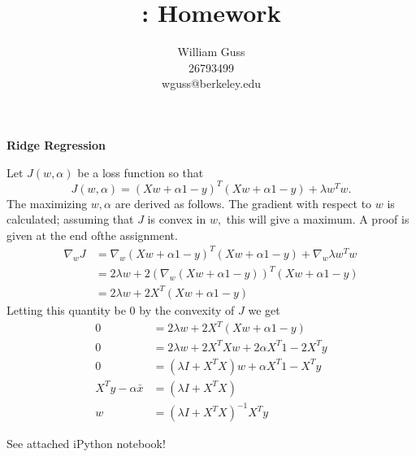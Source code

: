 \documentclass[letter]{article}
\title{\bCLASS: Homework \bHWN}
\author{William Guss\\26793499\\wguss@berkeley.edu}
\newenvironment{menumerate}{%
  \edef\backupindent{\the\parindent}%
  \enumerate%
  \setlength{\parindent}{\backupindent}%
}{\endenumerate}
\begin{document}
\maketitle
\thispagestyle{empty}

\begin{menumerate}
  \item \textbf{Ridge Regression}
  \begin{menumerate}
    \item Let $J(w, \alpha)$ be a loss function so that
    \begin{equation}
      J(w, \alpha) = (Xw + \alpha1 - y)^T(Xw + \alpha1 - y) + \lambda w^T w.     
     \end{equation}
     The maximizing $w, \alpha$ are derived as follows. The gradient with respect to $w$ is calculated; assuming that $J$ is convex in $w,$  this will give a maximum. A proof is given at the end ofthe assignment.
     \begin{equation*}
      \begin{aligned}
        \nabla_w J &= \nabla_w (Xw + \alpha1 - y)^T(Xw + \alpha1 - y) + \nabla_w \lambda w^T w \\
        &=  2 \lambda w  +2(\nabla_w (Xw + \alpha1 - y))^T(Xw + \alpha1 - y) \\
        &= 2 \lambda w +2X^T(Xw + \alpha1 - y)
      \end{aligned}    
     \end{equation*}
     Letting this quantity be $0$ by the convexity of $J$ we get
     \begin{equation}
        \begin{aligned}
          0 &=2 \lambda w +2X^T(Xw + \alpha1 - y) \\
          0 &= 2\lambda w + 2X^TXw + 2\alpha X^T 1 - 2X^Ty \\
          0 &= ( \lambda I + X^TX)w + \alpha X^T 1 - X^T y \\
          X^Ty - \alpha \bar x &= ( \lambda I + X^TX) \\
          w &= ( \lambda I + X^TX)^{-1}  X^Ty
        \end{aligned}
     \end{equation}
     \item See attached iPython notebook!
  \end{menumerate}


\end{menumerate}
\end{document}
